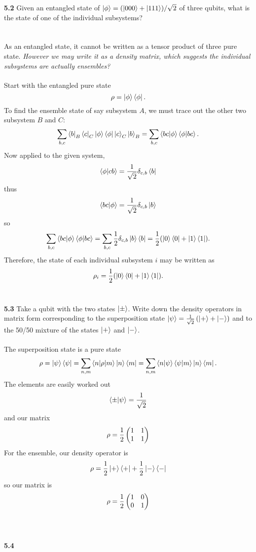 \documentclass[11pt,letterpaper]{article}
\begin{document}
		
	\item[\textbf{5.2}]
	Given an entangled state of $\ket\phi = (\ket{000}+\ket{111})/\sqrt 2$ of three qubits,
	what is the state of one of the individual subsystems?
	\\
	\\
	\\
	As an entangled state, it cannot be written as a tensor product of three pure state. \emph{However we may write it as a 	density matrix, which suggests the individual subsystems are actually ensembles?}
	\\
	\\
	Start with the entangled pure state
	\[
		\rho = \ket\phi\bra\phi.
	\]
	To find the ensemble state of say subsystem $A$, we must trace out the other two subsystem $B$ and $C$:
	\[
		\sum_{b,c} \bra b_B\bra c_C\ket\phi\bra\phi \ket c_C\ket b_B = \sum_{b,c}\braket{bc|\phi}\braket{\phi|bc}.
	\]
	Now applied to the given system,
	\[
		\braket{\phi|cb} = \frac{1}{\sqrt 2} \delta_{c,b}\bra{b}
	\]
	thus
	\[
		\braket{bc|\phi} = \frac{1}{\sqrt 2} \delta_{c,b} \ket{b}
	\]
	so
	\[
		\sum_{b,c}\braket{bc|\phi}\braket{\phi|bc} = \sum_{b,c}\frac{1}{2}\delta_{c,b}\ket b\bra b = \frac{1}{2}(
		\ket 0\bra 0+\ket 1\bra 1).
	\]
	Therefore, the state of each individual subsystem $i$ may be written as
	\[
		\rho_i =  \frac{1}{2}(\ket 0\bra 0+\ket 1\bra 1).
	\]
	\\
	\item[\textbf{5.3}]
	Take a qubit with the two states $\ket\pm$. Write down the density operators in matrix form corresponding
	to the superposition state $\ket\psi = \frac{1}{\sqrt 2}\left(\ket ++\ket -\right)$ and to the 50/50 mixture of the 
	states $\ket +$ and $\ket -$. 
	\\
	\\
	The superposition state is a pure state
	\[
		\rho = \ket{\psi}\bra\psi = \sum_{n,m}\braket{n|\rho|m}\ket n\bra m = 
		\sum_{n,m}\braket{n|\psi}\braket{\psi|m}\ket n\bra m.
	\]
	The elements are easily worked out
	\[
		\braket{\pm|\psi} = \frac{1}{\sqrt 2}
	\]
	and our matrix
	\[
		\rho= \frac{1}{2}\begin{pmatrix} 1&1\\1&1\end{pmatrix}
	\]
	For the ensemble, our density operator is
	\[
		\rho = \frac{1}{2}\ket +\bra++\frac{1}{2}\ket -\bra -
	\]
	so our matrix is
	\[
		\rho = \frac{1}{2}\begin{pmatrix} 1&0\\0&1\end{pmatrix}
	\]
	\\
	\\
	\item[\textbf{5.4}]
	
\end{document}
